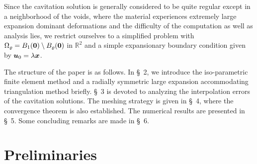 \documentclass[12pt]{article}
\renewcommand{\vec}[1]{\mbox{\boldmath$#1$}}
\numberwithin{equation}{section}
\begin{document}
Since the cavitation solution is generally considered to be quite regular except
in a neighborhood of the voids, where the material experiences extremely large expansion
dominant deformations and the difficulty of the computation as well as
analysis lies, we restrict ourselves to a simplified problem with
$\Omega_\varrho = B_1(\vec{0}) \setminus B_{\varrho}(\vec{0})$ in $\mathbb{R}^2$
and a simple expansionary boundary condition given by $\vec{u}_0=\lambda \vec{x}$.

The structure of the paper is as follows. In \S~2, we introduce
the iso-parametric finite element method and a radially symmetric large expansion
accommodating triangulation method briefly. \S~3 is
devoted to analyzing the interpolation errors of the cavitation solutions.
The meshing strategy is given in \S~4, where the convergence theorem is also established.
The numerical results are presented
in \S~5. Some concluding remarks are made in \S~6.

\section{Preliminaries}
\end{document}
